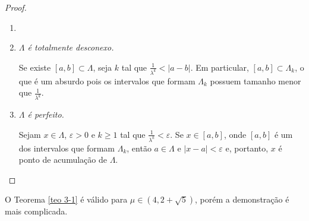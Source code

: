 \begin{proof}
\begin{enumerate}[label=\alph*)]\item[]
\item \textit{$\Lambda$ é totalmente desconexo.}

Se existe $[a, b] \subset \Lambda$, seja $k$ tal que $\frac{1}{\lambda^k} < |a - b|$.
Em particular, $[a, b] \subset \Lambda_k$, o que é um absurdo pois os intervalos que formam $\Lambda_k$ possuem tamanho menor que $\frac{1}{\lambda^k}$.

\item \textit{$\Lambda$ é perfeito.}

Sejam $x \in \Lambda$, $\varepsilon > 0$ e $k \geq 1$ tal que $\frac{1}{\lambda^k} < \varepsilon$.
Se $x \in [a, b]$, onde $[a, b]$ é um dos intervalos que formam $\Lambda_k$, então $a \in \Lambda$ e $|x - a| < \varepsilon$ e, portanto, $x$ é ponto de acumulação de $\Lambda$.
\end{enumerate}
\end{proof}

O Teorema \ref{teo 3-1} é válido para $\mu \in (4, 2 + \sqrt{5})$, porém a demonstração é mais complicada.